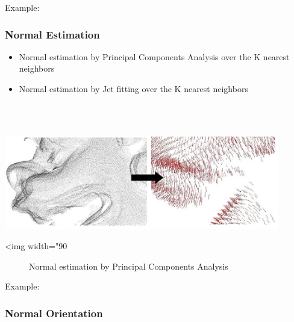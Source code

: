 Example:



\subsubsection{Normal Estimation}

\begin{itemize}
\item Normal estimation by Principal Components Analysis over the K nearest neighbors
\item Normal estimation by Jet fitting over the K nearest neighbors
\end{itemize}

  \\
  \\

\begin{center}
    \label{Surface_reconstruction_3-fig-pca_normal_estimation}
    \begin{ccTexOnly}
        \includegraphics[width=0.9\textwidth]{Surface_reconstruction_3/pca_normal_estimation} %
    \end{ccTexOnly}
    \begin{ccHtmlOnly}
        <img width="90%
    \end{ccHtmlOnly}
    \begin{figure}[h]
        \caption{Normal estimation by Principal Components Analysis}
    \end{figure}
\end{center}

Example:



\subsubsection{Normal Orientation}

